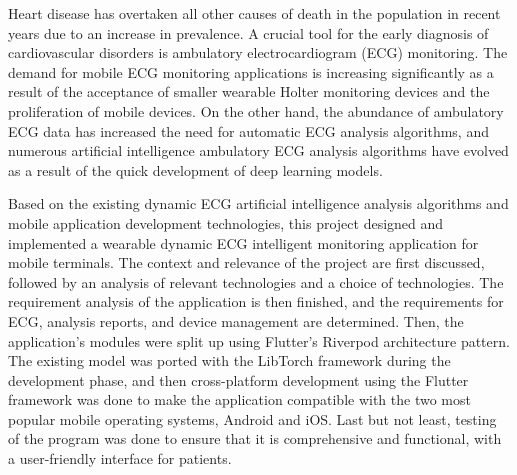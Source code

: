 \begin{abstractEN}

    Heart disease has overtaken all other causes of death in the population in recent years due to an increase in prevalence.
    A crucial tool for the early diagnosis of cardiovascular disorders is ambulatory electrocardiogram (ECG) monitoring.
    The demand for mobile ECG monitoring applications is increasing significantly as a result of the acceptance of smaller wearable Holter monitoring devices and the proliferation of mobile devices.
    On the other hand, the abundance of ambulatory ECG data has increased the need for automatic ECG analysis algorithms, and numerous artificial intelligence ambulatory ECG analysis algorithms have evolved as a result of the quick development of deep learning models.

    Based on the existing dynamic ECG artificial intelligence analysis algorithms and mobile application development technologies, this project designed and implemented a wearable dynamic ECG intelligent monitoring application for mobile terminals.
    The context and relevance of the project are first discussed, followed by an analysis of relevant technologies and a choice of technologies.
    The requirement analysis of the application is then finished, and the requirements for ECG, analysis reports, and device management are determined.
    Then, the application's modules were split up using Flutter's Riverpod architecture pattern.
    The existing model was ported with the LibTorch framework during the development phase, and then cross-platform development using the Flutter framework was done to make the application compatible with the two most popular mobile operating systems, Android and iOS. Last but not least, testing of the program was done to ensure that it is comprehensive and functional, with a user-friendly interface for patients.


\end{abstractEN}
